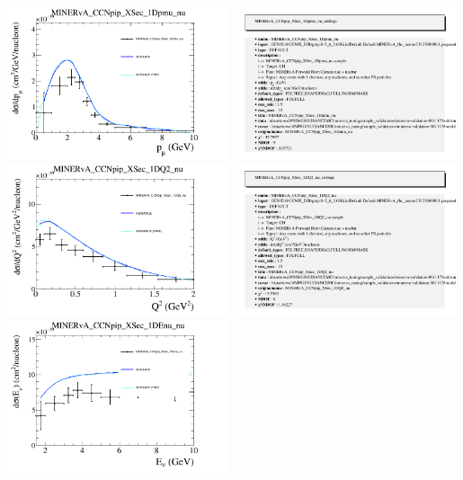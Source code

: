 \documentclass{article}
\begin{document}
\centering
\includegraphics[width=0.49\textwidth]{figures/nuisance_MINERvA_CCNpip_XSec_1Dpmu_nu_comp.png}
\includegraphics[width=0.49\textwidth]{figures/nuisance_MINERvA_CCNpip_XSec_1Dpmu_nu_info.png}
\centering
\includegraphics[width=0.49\textwidth]{figures/nuisance_MINERvA_CCNpip_XSec_1DQ2_nu_comp.png}
\includegraphics[width=0.49\textwidth]{figures/nuisance_MINERvA_CCNpip_XSec_1DQ2_nu_info.png}
\centering
\includegraphics[width=0.49\textwidth]{figures/nuisance_MINERvA_CCNpip_XSec_1DEnu_nu_comp.png}
\end{document}
